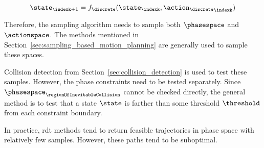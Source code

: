			\begin{equation}
				\state_{\indexk + 1} = f_{\discrete}(\state_{\indexk},
					{\action_{\discrete}}_{\indexk})
			\end{equation}

			Therefore, the sampling algorithm needs to sample both $\phasespace$
			and $\actionspace$. The methods mentioned in
			Section~\ref{sec:sampling_based_motion_planning} are generally used
			to sample these spaces.

			Collision detection from Section~\ref{sec:collision_detection} is
			used to test these samples. However, the phase constraints need to
			be tested separately. Since
			$\phasespace_{\regionOfInevitableCollision}$ cannot be checked
			directly, the general method is to test that a state $\state$ is
			farther than some threshold $\threshold$ from each constraint
			boundary.

			In practice, \gls{rdt} methods tend to return feasible trajectories
			in phase space with relatively few samples. However, these paths
			tend to be suboptimal.



